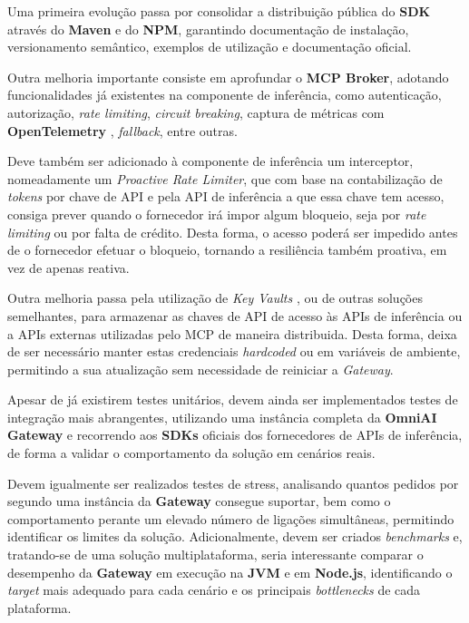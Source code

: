 Uma primeira evolução passa por consolidar a distribuição pública do \textbf{SDK} através do \textbf{Maven} e do \textbf{NPM}, garantindo documentação de instalação, versionamento semântico, exemplos de utilização e documentação oficial.

Outra melhoria importante consiste em aprofundar o \textbf{MCP Broker}, adotando funcionalidades já existentes na componente de inferência, como autenticação, autorização, \textit{rate limiting}, \textit{circuit breaking}, captura de métricas com \textbf{OpenTelemetry} \cite{opentelemetry_otlp}, \textit{fallback}, entre outras.

Deve também ser adicionado à componente de inferência um interceptor, nomeadamente um \textit{Proactive Rate Limiter}, que com base na contabilização de \textit{tokens} por chave de API e pela API de inferência a que essa chave tem acesso, consiga prever quando o fornecedor irá impor algum bloqueio, seja por \textit{rate limiting} ou por falta de crédito. Desta forma, o acesso poderá ser impedido antes de o fornecedor efetuar o bloqueio, tornando a resiliência também proativa, em vez de apenas reativa.

Outra melhoria passa pela utilização de \textit{Key Vaults} \cite{ref_keyVault}, ou de outras soluções semelhantes, para armazenar as chaves de API de acesso às APIs de inferência ou a APIs externas utilizadas pelo MCP de maneira distribuida. Desta forma, deixa de ser necessário manter estas credenciais \textit{hardcoded} ou em variáveis de ambiente, permitindo a sua atualização sem necessidade de reiniciar a \textit{Gateway}.

Apesar de já existirem testes unitários, devem ainda ser implementados testes de integração mais abrangentes, utilizando uma instância completa da \textbf{OmniAI Gateway} e recorrendo aos \textbf{SDKs} oficiais dos fornecedores de APIs de inferência, de forma a validar o comportamento da solução em cenários reais.

Devem igualmente ser realizados testes de stress, analisando quantos pedidos por segundo uma instância da \textbf{Gateway} consegue suportar, bem como o comportamento perante um elevado número de ligações simultâneas, permitindo identificar os limites da solução. Adicionalmente, devem ser criados \textit{benchmarks} e, tratando-se de uma solução multiplataforma, seria interessante comparar o desempenho da \textbf{Gateway} em execução na \textbf{JVM} e em \textbf{Node.js}, identificando o \textit{target} mais adequado para cada cenário e os principais \textit{bottlenecks} de cada plataforma.

